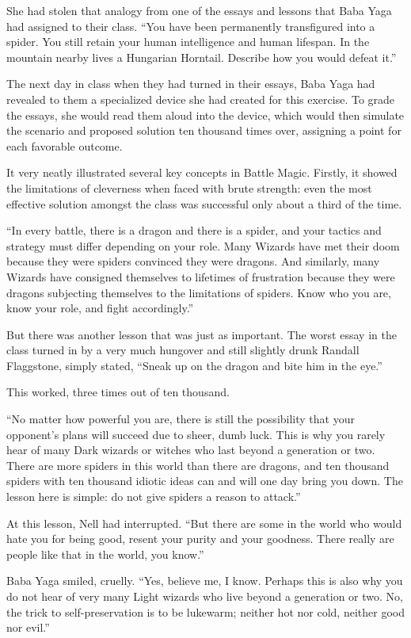 She had stolen that analogy from one of the essays and lessons that Baba Yaga had assigned to their class. “You have been permanently transfigured into a spider. You still retain your human intelligence and human lifespan. In the mountain nearby lives a Hungarian Horntail. Describe how you would defeat it.”

The next day in class when they had turned in their essays, Baba Yaga had revealed to them a specialized device she had created for this exercise. To grade the essays, she would read them aloud into the device, which would then simulate the scenario and proposed solution ten thousand times over, assigning a point for each favorable outcome.

It very neatly illustrated several key concepts in Battle Magic. Firstly, it showed the limitations of cleverness when faced with brute strength: even the most effective solution amongst the class was successful only about a third of the time.

“In every battle, there is a dragon and there is a spider, and your tactics and strategy must differ depending on your role. Many Wizards have met their doom because they were spiders convinced they were dragons. And similarly, many Wizards have consigned themselves to lifetimes of frustration because they were dragons subjecting themselves to the limitations of spiders. Know who you are, know your role, and fight accordingly.”

But there was another lesson that was just as important. The worst essay in the class turned in by a very much hungover and still slightly drunk Randall Flaggstone, simply stated, “Sneak up on the dragon and bite him in the eye.”

This worked, three times out of ten thousand.

“No matter how powerful you are, there is still the possibility that your opponent’s plans will succeed due to sheer, dumb luck. This is why you rarely hear of many Dark wizards or witches who last beyond a generation or two. There are more spiders in this world than there are dragons, and ten thousand spiders with ten thousand idiotic ideas can and will one day bring you down. The lesson here is simple: do not give spiders a reason to attack.”

At this lesson, Nell had interrupted. “But there are some in the world who would hate you for being good, resent your purity and your goodness. There really are people like that in the world, you know.”

Baba Yaga smiled, cruelly. “Yes, believe me, I know. Perhaps this is also why you do not hear of very many Light wizards who live beyond a generation or two. No, the trick to self-preservation is to be lukewarm; neither hot nor cold, neither good nor evil.”

